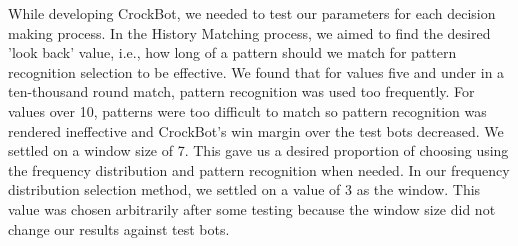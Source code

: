 	While developing CrockBot, we needed to test our parameters for each decision making process. In the History Matching process, we aimed to find the desired 'look back' value, i.e., how long of a pattern should we match for pattern recognition selection to be effective. We found that for values five and under in a ten-thousand round match, pattern recognition was used too frequently. For values over 10, patterns were too difficult to match so pattern recognition was rendered ineffective and CrockBot's win margin over the test bots decreased. We settled on a window size of 7. This gave us a desired proportion of choosing using the frequency distribution and pattern recognition when needed. In our frequency distribution selection method, we settled on a value of 3 as the window. This value was chosen arbitrarily after some testing because the window size did not change our results against test bots.
	